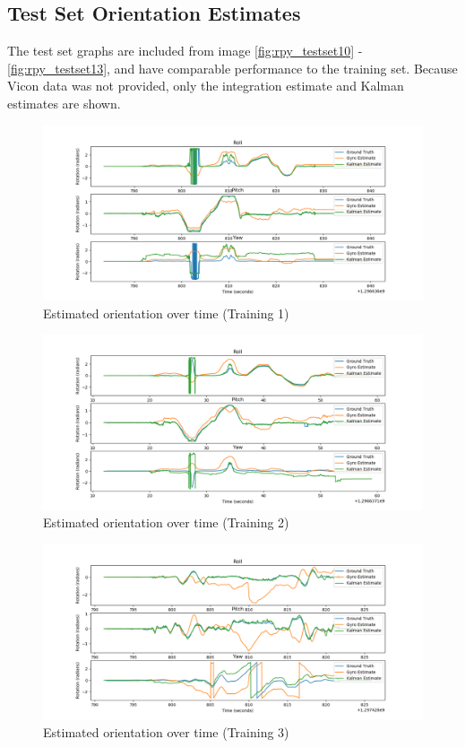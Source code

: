 \documentclass[a4paper]{article}
\begin{document}
\subsection{Test Set Orientation Estimates}

The test set graphs are included from image \ref{fig:rpy_testset10} - \ref{fig:rpy_testset13}, and have comparable performance to the training set. Because Vicon data was not provided, only the integration estimate and Kalman estimates are shown.

\begin{figure}[h]
  \centering
    \includegraphics[width=1\textwidth]{rpy_trainset1.png}
  \caption{Estimated orientation over time (Training 1)\label{fig:rpy_trainset1}}
\end{figure}

\begin{figure}[h]
  \centering
    \includegraphics[width=1\textwidth]{rpy_trainset2.png}
  \caption{Estimated orientation over time (Training 2)\label{fig:rpy_trainset2}}
\end{figure}

\begin{figure}[h]
  \centering
    \includegraphics[width=1\textwidth]{rpy_trainset3.png}
  \caption{Estimated orientation over time (Training 3)\label{fig:rpy_trainset3}}
\end{figure}
\end{document}
